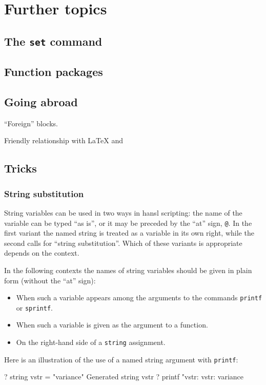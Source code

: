 \part{Further topics}

\chapter{The \texttt{set} command}
\label{chap:settings}

\chapter{Function packages}

\chapter{Going abroad}
``Foreign'' blocks.


Friendly relationship with \LaTeX{} and 


\chapter{Tricks}
\section{String substitution}
\label{sec:stringsub}

String variables can be used in two ways in hansl scripting: the name
of the variable can be typed ``as is'', or it may be preceded by the
``at'' sign, \verb|@|. In the first variant the named string is
treated as a variable in its own right, while the second calls for
``string substitution''. Which of these variants is appropriate
depends on the context.

In the following contexts the names of string variables should be
given in plain form (without the ``at'' sign):

\begin{itemize}
\item When such a variable appears among the arguments to the
  commands \texttt{printf} or \texttt{sprintf}.
\item When such a variable is given as the argument to a function.
\item On the right-hand side of a \texttt{string} assignment.
\end{itemize}

Here is an illustration of the use of a named string argument with
\texttt{printf}:
%
\begin{code}
? string vstr = "variance"
Generated string vstr
? printf "vstr: %
vstr:     variance
\end{code}

